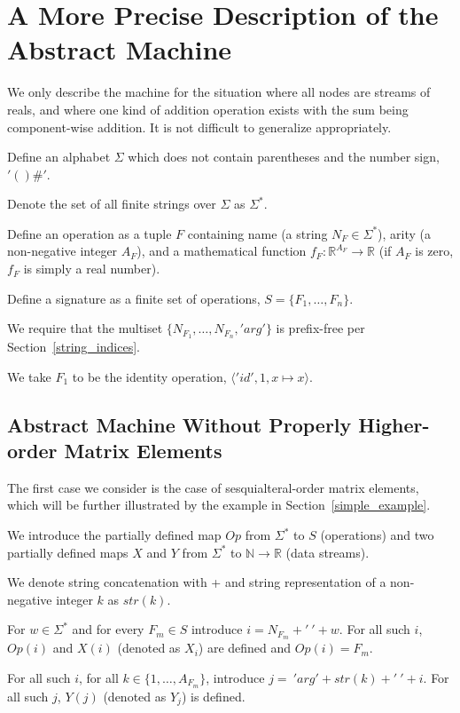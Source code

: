 \documentclass[withtimes]{easychair}
\begin{document}
\section{A More Precise Description of the Abstract Machine}\label{abstract_machine}

We only describe the machine for the situation where all nodes are streams of reals, and where one kind
of addition operation exists with the sum being component-wise addition. It is not difficult to generalize
appropriately.

Define an alphabet $\Sigma$ which does not contain parentheses and the number sign, $'()\#'$.

Denote the set of all finite strings over $\Sigma$ as $\Sigma^*$.

Define an operation as a tuple $F$ containing name (a string $N_F \in\Sigma^*$), arity (a non-negative integer $A_F$), and
a mathematical function $f_F : \mathbb{R}^{A_F} \rightarrow \mathbb{R}$ (if $A_F$ is zero, $f_F$ is simply a real number).

Define a signature as a finite set of operations, $S = \{F_1, \dots, F_n\}$. 

We require that the multiset $\{N_{F_1}, \dots, N_{F_n}, 'arg'\}$ is
prefix-free per Section~\ref{string_indices}.

We take $F_1$ to be the identity operation, $\langle 'id', 1, x \mapsto x \rangle$.

\subsection{Abstract Machine Without Properly Higher-order Matrix Elements}\label{abstract_basic}

The first case we consider is the case of sesquialteral-order matrix elements, which will be further
illustrated by the example in Section~\ref{simple_example}.

We introduce the partially defined map $Op$ from $\Sigma^*$ to $S$ (operations) and two partially
defined maps $X$ and $Y$ from $\Sigma^*$ to $\mathbb{N} \rightarrow \mathbb{R}$ (data streams).

We denote string concatenation with + and string representation of a non-negative integer $k$ as $str(k)$.

For $w \in \Sigma^*$ and for every $F_m \in S$ introduce 
$i= N_{F_m} + '\ '+w$. 
For all such $i$, $Op(i)$ and $X(i)$ (denoted as $X_i$) are defined and $Op(i) = F_m$.

For all such $i$, for all $k \in \{1, \dots, A_{F_m}\}$, introduce $j =\ 'arg' + str(k) + '\ ' + i$. 
For all such $j$, $Y(j)$ (denoted as $Y_j$) is defined. 
\end{document}
